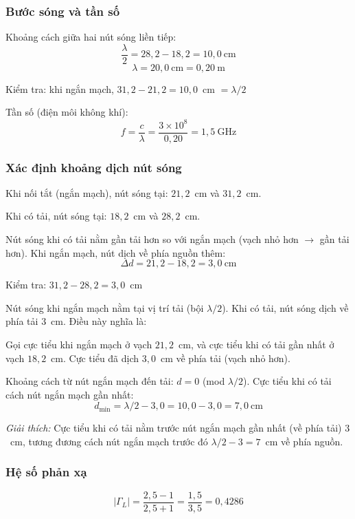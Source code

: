 \documentclass[12pt,a4paper]{article}
\begin{document}
\subsubsection{Bước sóng và tần số}

Khoảng cách giữa hai nút sóng liền tiếp:
\[
\frac{\lambda}{2} = 28{,}2 - 18{,}2 = 10{,}0~\text{cm}
\]
\[
\boxed{\lambda = 20{,}0~\text{cm} = 0{,}20~\text{m}}
\]

Kiểm tra: khi ngắn mạch, $31{,}2 - 21{,}2 = 10{,}0$~cm $= \lambda/2$ \checkmark

Tần số (điện môi không khí):
\[
\boxed{f = \frac{c}{\lambda} = \frac{3 \times 10^8}{0{,}20} = 1{,}5~\text{GHz}}
\]

\subsubsection{Xác định khoảng dịch nút sóng}

Khi nối tắt (ngắn mạch), nút sóng tại: $21{,}2$~cm và $31{,}2$~cm.

Khi có tải, nút sóng tại: $18{,}2$~cm và $28{,}2$~cm.

Nút sóng khi có tải nằm gần tải hơn so với ngắn mạch (vạch nhỏ hơn $\to$ gần tải hơn). Khi ngắn mạch, nút dịch về phía nguồn thêm:
\[
\Delta d = 21{,}2 - 18{,}2 = 3{,}0~\text{cm}
\]

Kiểm tra: $31{,}2 - 28{,}2 = 3{,}0$~cm \checkmark

Nút sóng khi ngắn mạch nằm tại vị trí tải (bội $\lambda/2$). Khi có tải, nút sóng dịch về phía tải $3$~cm. Điều này nghĩa là:

Gọi cực tiểu khi ngắn mạch ở vạch $21{,}2$~cm, và cực tiểu khi có tải gần nhất ở vạch $18{,}2$~cm. Cực tiểu đã dịch $3{,}0$~cm về phía tải (vạch nhỏ hơn).

Khoảng cách từ nút ngắn mạch đến tải: $d = 0$ (mod $\lambda/2$). Cực tiểu khi có tải cách nút ngắn mạch gần nhất:
\[
d_{\min} = \lambda/2 - 3{,}0 = 10{,}0 - 3{,}0 = 7{,}0~\text{cm}
\]

\textit{Giải thích:} Cực tiểu khi có tải nằm trước nút ngắn mạch gần nhất (về phía tải) $3$~cm, tương đương cách nút ngắn mạch trước đó $\lambda/2 - 3 = 7$~cm về phía nguồn.

\subsubsection{Hệ số phản xạ}

\[
|\Gamma_L| = \frac{2{,}5 - 1}{2{,}5 + 1} = \frac{1{,}5}{3{,}5} = 0{,}4286
\]
\end{document}
